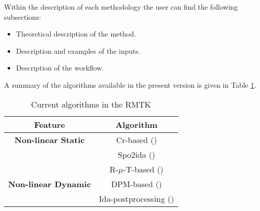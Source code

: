 Within the description of each methodology the user can find the following subsections:
\begin{itemize}
\item Theoretical description of the method.
\item Description and examples of the inputs.
\item Description of the workflow.
\end{itemize}

A summary of the algorithms available in the present version is given in Table \ref{tab:current_features}.
\begin{table}[!htbp]
\centering
\begin{tabular}{|c|c|} \hline
Feature & Algorithm\\ \hline
\textbf{Non-linear Static} & Cr-based (\cite{Ruiz-Garcia and Miranda, 2007})\\
    & Spo2ida (\cite{Vamvatsikos and Cornell, 2006}) \\
    & R-$\mu$-T-based (\cite{Dolsek and Fajfar, 2004}) \\ \hline
 \textbf{Non-linear Dynamic} & DPM-based (\cite{Silva et al., 2013})\\
  & Ida-postprocessing (\cite{Vamvatsikos and Cornell, 2002}) \\ \hline
\end{tabular}
\caption{Current algorithms in the RMTK}
\label{tab:current_features}
\end{table}

